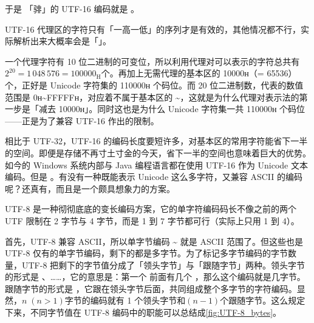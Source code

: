 于是 \relax{}「𬴂」的 UTF-16 编码就是 。

\begin{note}
  UTF-16 代理区的字符只有「一高一低」的序列才是有效的，其他情况都不行，实际解析出来大概率会是「\replacesymb」。
\end{note}

一个代理字符有 10 位二进制的可变位，所以利用代理对可以表示的字符总共有$2^{20} = 1\,048\,576 = 100000_\mathrm{H}$个。再加上无需代理的基本区的 10000ʜ（= 65536）个，正好是 Unicode 字符集的 110000ʜ 个码位。而 20 位二进制数，代表的数值范围是 0ʜ\textasciitilde{}FFFFFʜ，对应着不属于基本区的 \textasciitilde{}，这就是为什么代理对表示法的第一步是「减去 10000ʜ」。同时这也是为什么 Unicode 字符集一共 110000ʜ 个码位——正是为了兼容 UTF-16 作出的限制。

相比于 UTF-32，UTF-16 的编码长度要短许多，对基本区的常用字符能省下一半的空间。即便是存储不再寸土寸金的今天，省下一半的空间也意味着巨大的优势。如今的 Windows 系统内部与 Java 编程语言都在使用 UTF-16 作为 Unicode 文本编码。但是 。有没有一种既能表示 Unicode 这么多字符，又兼容 ASCII 的编码呢？还真有，而且是一个颇具想象力的方案。

UTF-8 是一种彻彻底底的变长编码方案，它的单字符编码码长不像之前的两个 UTF 限制在 2 字节与 4 字节，而是 1 到 7 字节都可行（实际上只用 1 到 4）。

首先，UTF-8 兼容 ASCII，所以单字节编码 \textasciitilde{} 就是 ASCII 范围了。但这些也是 UTF-8 仅有的单字节编码，剩下的都是多字节。为了标记多字节编码的字节数量，UTF-8 把剩下的字节值分成了「领头字节」与「跟随字节」两种。领头字节的形式是 、……，它的意思是：第一个  前面有几个 ，那么这个编码就是几字节。跟随字节的形式是 ，它跟在领头字节后面，共同组成整个多字节的字符编码。显然，$n\;(n>1)$字节的编码就有 1 个领头字节和$(n-1)$个跟随字节。这么规定下来，不同字节值在 UTF-8 编码中的职能可以总结成\autoref{fig:UTF-8_bytes}。

